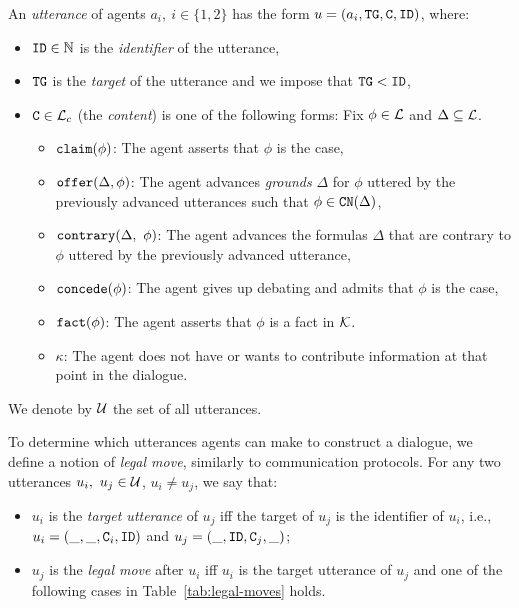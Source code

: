 \begin{definition} [Utterances]
An \emph{utterance} of agents $a_i,\ i \in \{1,2\}$ has the form $u = (a_i, \texttt{\textup{TG}}, \texttt{\textup{C}}, \texttt{\textup{ID}})$, where:
\begin{itemize}
    \item $\texttt{\textup{ID}} \in \mathbb{N}$ is the \emph{identifier} of the utterance,

    \item $\texttt{\textup{TG}}$ is the \emph{target} of the utterance and we impose that $\texttt{\textup{TG}} < \texttt{\textup{ID}}$,
    \item $\texttt{\textup{C}} \in \mathcal{L}_c$ (the \emph{content}) is one of the following forms: Fix $\phi \in \mathcal{L}$ and $\Delta \subseteq \mathcal{L}$.
    
    \begin{itemize}
         \item $\texttt{\textup{claim}}(\phi)$: The agent asserts that $\phi$ is the case,
        
         \item $\texttt{\textup{offer}}(\Delta, \phi)$: The agent advances \emph{grounds} $\Delta$ for $\phi$ uttered by the previously advanced utterances such that $\phi \in \texttt{\textup{CN}}(\Delta)$,
    
        \item $\texttt{\textup{contrary}}(\Delta,\ \phi)$: The agent advances the formulas $\Delta$ that are contrary to $\phi$ uttered by the previously advanced utterance,
        \item $\texttt{\textup{concede}}(\phi)$: The agent gives up debating and admits that $\phi$ is the case,

         \item $\texttt{\textup{fact}}(\phi)$: The agent asserts that $\phi$ is a fact in $\mathcal{K}$.

         \item $\kappa$: The agent does not have or wants to contribute information at that point in the dialogue.

    \end{itemize}  
\end{itemize}
We denote by $\mathcal{U}$ the set of all utterances. 
\end{definition}

To determine which utterances agents can make to construct a dialogue, we define a notion of \emph{legal move}, similarly to communication protocols. For any two utterances $u_i,\ u_j \in \mathcal{U}$, $u_i \neq u_j$, we say that:
\begin{itemize}
    \item $u_i$ is the \emph{target utterance} of $u_j$ iff the target of $u_j$ is the identifier of $u_i$, i.e., $u_i = (\_, \_, \texttt{\textup{C}}_i, \texttt{\textup{ID}})$ and $u_j = (\_, \texttt{\textup{ID}}, \texttt{\textup{C}}_j, \_)$;

    \item $u_j$ is the \emph{legal move} after $u_i$ iff $u_i$ is the target utterance of $u_j$ and one of the following cases in Table~\ref{tab:legal-moves} holds.
    \end{itemize}

